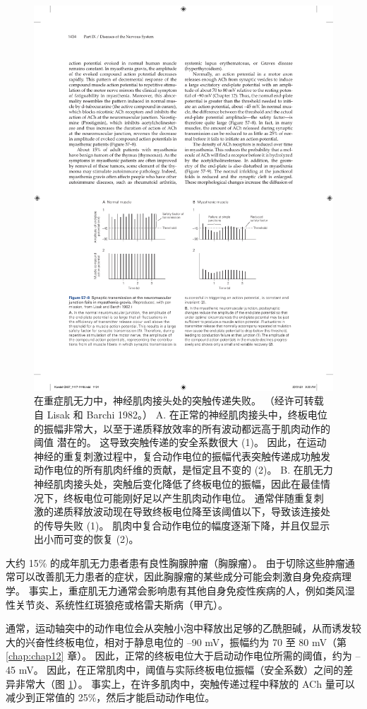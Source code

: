 \begin{figure}[htbp]
	\centering
	\includegraphics[width=0.7\linewidth]{chap57/fig_57_8}
	\caption{在重症肌无力中，神经肌肉接头处的突触传递失败。 （经许可转载自 Lisak 和 Barchi 1982。） A. 在正常的神经肌肉接头中，终板电位的振幅非常大，以至于递质释放效率的所有波动都远高于肌肉动作的阈值 潜在的。 这导致突触传递的安全系数很大 (1)。 因此，在运动神经的重复刺激过程中，复合动作电位的振幅代表突触传递成功触发动作电位的所有肌肉纤维的贡献，是恒定且不变的 (2)。 B. 在肌无力神经肌肉接头处，突触后变化降低了终板电位的振幅，因此在最佳情况下，终板电位可能刚好足以产生肌肉动作电位。 通常伴随重复刺激的递质释放波动现在导致终板电位降至该阈值以下，导致该连接处的传导失败 (1)。 肌肉中复合动作电位的幅度逐渐下降，并且仅显示出小而可变的恢复 (2)。}
	\label{fig:57_8}
\end{figure}

大约 15\% 的成年肌无力患者患有良性胸腺肿瘤（胸腺瘤）。 由于切除这些肿瘤通常可以改善肌无力患者的症状，因此胸腺瘤的某些成分可能会刺激自身免疫病理学。 事实上，重症肌无力通常会影响患有其他自身免疫性疾病的人，例如类风湿性关节炎、系统性红斑狼疮或格雷夫斯病（甲亢）。

通常，运动轴突中的动作电位会从突触小泡中释放出足够的乙酰胆碱，从而诱发较大的兴奋性终板电位，相对于静息电位的 –90 mV，振幅约为 70 至 80 mV（第 \ref{chap:chap12} 章）。 因此，正常的终板电位大于启动动作电位所需的阈值，约为 –45 mV。 因此，在正常肌肉中，阈值与实际终板电位振幅（安全系数）之间的差异非常大（图 \ref{fig:57_8}）。 事实上，在许多肌肉中，突触传递过程中释放的 ACh 量可以减少到正常值的 25\%，然后才能启动动作电位。

